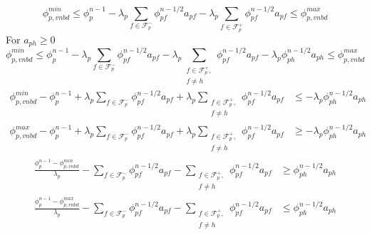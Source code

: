 \documentclass[../thesis.tex]{subfiles}
\begin{document}
\begin{equation*}
	\phi_{p, vnbd}^{min}
	\leq
	\phi_p^{n-1}
	- \lambda_p\sum_{f \in \mathcal{F}_p^-} \phi_{pf}^{n-1/2} a_{pf}
	- \lambda_p\sum_{f \in \mathcal{F}_p^+} \phi_{pf}^{n-1/2} a_{pf}
	\leq
	\phi_{p, vnbd}^{max}
\end{equation*}
For \( a_{ph} \geq 0 \)
\begin{equation*}
	\phi_{p,vnbd}^{min}
	\leq
	\phi_p^{n-1}
	- \lambda_p\sum_{f \in \mathcal{F}_p^-} \phi_{pf}^{n-1/2} a_{pf}
	- \lambda_p\sum_{
		\substack{
			f \in \mathcal{F}_p^+, \\
			f \neq h}
			} \phi_{pf}^{n-1/2} a_{pf}
	- \lambda_p \phi_{ph}^{n-1/2} a_{ph}
	\leq
	\phi_{p,vnbd}^{max}
\end{equation*}
\begin{equation*}
	\begin{split}
		\phi_{p,vnbd}^{min} - \phi_p^{n-1}
		+ \lambda_p\sum_{f \in \mathcal{F}_p^-} \phi_{pf}^{n-1/2} a_{pf}
		+ \lambda_p\sum_{
			\substack{
				f \in \mathcal{F}_p^+, \\
				f \neq h}
				} \phi_{pf}^{n-1/2} a_{pf}
		&\leq
		- \lambda_p \phi_{ph}^{n-1/2} a_{ph}
		\\
		\phi_{p,vnbd}^{max} - \phi_p^{n-1}
		+ \lambda_p\sum_{f \in \mathcal{F}_p^-} \phi_{pf}^{n-1/2} a_{pf}
		+ \lambda_p\sum_{
			\substack{
				f \in \mathcal{F}_p^+, \\
				f \neq h}
				} \phi_{pf}^{n-1/2} a_{pf}
		&\geq
		- \lambda_p \phi_{ph}^{n-1/2} a_{ph}
	\end{split}
\end{equation*}
\begin{equation*}
	\begin{split}
		\frac{\phi_p^{n-1} - \phi_{p,vnbd}^{min}}{\lambda_p}
		- \sum_{f \in \mathcal{F}_p^-} \phi_{pf}^{n-1/2} a_{pf}
		- \sum_{
			\substack{
				f \in \mathcal{F}_p^+, \\
				f \neq h}
				} \phi_{pf}^{n-1/2} a_{pf}
		&\geq
		\phi_{ph}^{n-1/2} a_{ph}
		\\
		\frac{\phi_p^{n-1} - \phi_{p,vnbd}^{max}}{\lambda_p}
		- \sum_{f \in \mathcal{F}_p^-} \phi_{pf}^{n-1/2} a_{pf}
		- \sum_{
			\substack{
				f \in \mathcal{F}_p^+, \\
				f \neq h}
				} \phi_{pf}^{n-1/2} a_{pf}
		&\leq
		\phi_{ph}^{n-1/2} a_{ph}
	\end{split}
\end{equation*}
\end{document}
